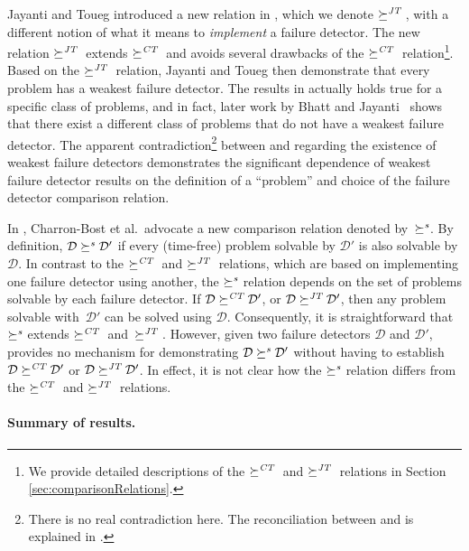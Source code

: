 \documentclass[11pt]{article}
\newcommand{\ident}[1]{\textit{#1}\rule{0cm}{1ex}}
\newcommand{\D}{\mathcal{D}}
\newcommand{\redCT}{\succeq^\ident{CT}}
\newcommand{\redJT}{\succeq^\ident{JT}}
\newcommand{\redSolv}{\succeq^{\ident{s}}}
\begin{document}
Jayanti and Toueg introduced a new relation in \cite{jayanti:ephawfd},
     which we denote $\redJT$, with a different notion of what it
     means to \emph{implement} a failure detector.
The new relation $\redJT$ extends $\redCT$ and avoids several
     drawbacks of the $\redCT$ relation\footnote{We provide detailed
     descriptions of the $\redCT$ and $\redJT$ relations in Section
     \ref{sec:comparisonRelations}.}.
Based on the $\redJT$ relation, Jayanti and Toueg then demonstrate
     that every problem has a weakest failure detector.
The results in \cite{jayanti:ephawfd} actually holds true for a
     specific class of problems, and in fact, later work by Bhatt and
     Jayanti~\cite{bhatt:oteow} shows that there exist a different
     class of problems that do not have a weakest failure detector.
The apparent contradiction\footnote{There is no real
     contradiction here.
The reconciliation between \cite{jayanti:ephawfd} and
     \cite{bhatt:oteow} is explained in \cite{bhatt:oteow}.} between
     \cite{jayanti:ephawfd} and \cite{bhatt:oteow} regarding the
     existence of weakest failure detectors demonstrates the
     significant dependence of weakest failure detector results on the
     definition of a ``problem''  and choice of the failure detector
     comparison relation.



In \cite{charron-bost:10:isolt}, Charron-Bost et al.\  advocate a
     new comparison relation denoted by~$\redSolv$.
By definition, $\D \redSolv \D'$ if  every (time-free)
     problem solvable by $\D'$ is also solvable by $\D$.
In contrast to the $\redCT$ and $\redJT$ relations, which are based on
     implementing one failure detector using another, the $\redSolv$
     relation depends on the set of problems solvable by each failure
     detector.
If $\D \redCT \D'$, or $\D \redJT \D'$, then any problem
     solvable with~$\D'$ can be solved using $\D$.
Consequently, it is straightforward that~$\redSolv$ extends $\redCT$
     and~$\redJT$.
However, given two failure detectors $\D$ and $\D'$,
     \cite{charron-bost:10:isolt} provides no mechanism for
     demonstrating $\D \redSolv\D'$ without having to establish $\D
     \redCT \D'$ or $\D \redJT \D'$.
In effect, it is not clear how the $\redSolv$ relation differs from
     the $\redCT$ and $\redJT$ relations.

\medskip

\paragraph{Summary of results.} 
\end{document}
